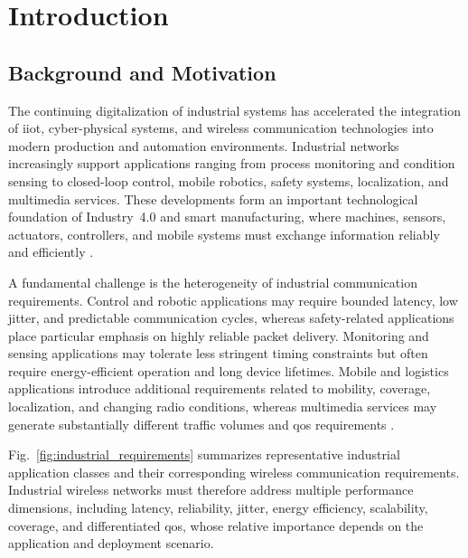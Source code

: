 \section{Introduction}
\label{sec:introduction}

\subsection{Background and Motivation}
\label{subsec:background_motivation}

The continuing digitalization of industrial systems has accelerated the
integration of \gls{iiot}, cyber-physical systems, and wireless communication
technologies into modern production and automation environments. Industrial
networks increasingly support applications ranging from process monitoring and
condition sensing to closed-loop control, mobile robotics, safety systems,
localization, and multimedia services. These developments form an important
technological foundation of Industry~4.0 and smart manufacturing, where
machines, sensors, actuators, controllers, and mobile systems must exchange
information reliably and efficiently
\cite{xuInternetThingsIndustries2014,
sisinniIndustrialInternetThings2018,
boyesIndustrialInternetThings2018,
wollschlaegerFutureIndustrialCommunication2017a}.

A fundamental challenge is the heterogeneity of industrial communication
requirements. Control and robotic applications may require bounded latency,
low jitter, and predictable communication cycles, whereas safety-related
applications place particular emphasis on highly reliable packet delivery.
Monitoring and sensing applications may tolerate less stringent timing
constraints but often require energy-efficient operation and long device
lifetimes. Mobile and logistics applications introduce additional requirements
related to mobility, coverage, localization, and changing radio conditions,
whereas multimedia services may generate substantially different traffic
volumes and \gls{qos} requirements
\cite{sisinniIndustrialInternetThings2018,
wollschlaegerFutureIndustrialCommunication2017a}.

Fig.~\ref{fig:industrial_requirements} summarizes representative industrial
application classes and their corresponding wireless communication
requirements. Industrial wireless networks must therefore address multiple
performance dimensions, including latency, reliability, jitter, energy
efficiency, scalability, coverage, and differentiated \gls{qos}, whose
relative importance depends on the application and deployment scenario.

